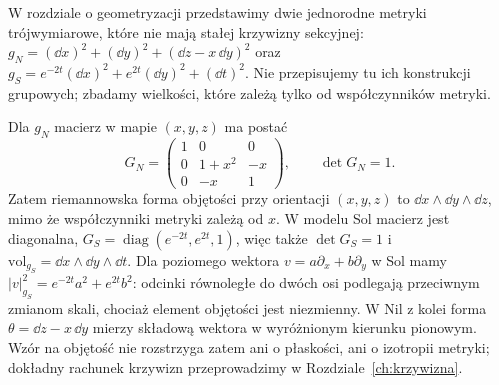 \begin{przyklad}
\label{prz:thur-dop-metryki-nil-sol}
W rozdziale o geometryzacji przedstawimy dwie jednorodne metryki
trójwymiarowe, które nie mają stałej krzywizny sekcyjnej:
$g_N=(\dd x)^2+(\dd y)^2+(\dd z-x\,\dd y)^2$ oraz
$g_S=e^{-2t}(\dd x)^2+e^{2t}(\dd y)^2+(\dd t)^2$.
Nie przepisujemy tu ich konstrukcji grupowych; zbadamy wielkości,
które zależą tylko od współczynników metryki.

Dla $g_N$ macierz w mapie $(x,y,z)$ ma postać
\[
G_N=\begin{pmatrix}1&0&0\\0&1+x^2&-x\\0&-x&1\end{pmatrix},
\qquad \det G_N=1.
\]
Zatem riemannowska forma objętości przy orientacji $(x,y,z)$ to
$\dd x\wedge\dd y\wedge\dd z$, mimo że współczynniki metryki
zależą od $x$. W modelu Sol macierz jest diagonalna,
$G_S=\operatorname{diag}(e^{-2t},e^{2t},1)$,
więc także $\det G_S=1$ i
$\mathrm{vol}_{g_S}=\dd x\wedge\dd y\wedge\dd t$.
Dla poziomego wektora $v=a\partial_x+b\partial_y$ w Sol
mamy $|v|_{g_S}^2=e^{-2t}a^2+e^{2t}b^2$:
odcinki równoległe do dwóch osi podlegają przeciwnym zmianom
skali, chociaż element objętości jest niezmienny.
W Nil z kolei forma $\theta=\dd z-x\,\dd y$ mierzy składową
wektora w wyróżnionym kierunku pionowym.
Wzór na objętość nie rozstrzyga zatem ani o płaskości,
ani o izotropii metryki; dokładny rachunek krzywizn
przeprowadzimy w Rozdziale~\ref{ch:krzywizna}.
\end{przyklad}
